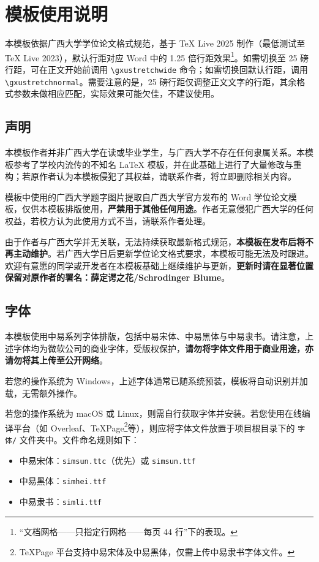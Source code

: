 \section{模板使用说明}

本模板依据广西大学学位论文格式规范，基于 \TeX{} Live 2025 制作（最低测试至 \TeX{} Live 2023），默认行距对应 Word 中的 1.25 倍行距效果\footnote{“文档网格——只指定行网格——每页 44 行”下的表现。}。如需切换至 25 磅行距，可在正文开始前调用 \verb|\gxustretchwide| 命令；如需切换回默认行距，调用 \verb|\gxustretchnormal|。需要注意的是，25 磅行距仅调整正文文字的行距，其余格式参数未做相应匹配，实际效果可能欠佳，不建议使用。

\subsection{声明}

本模板作者并非广西大学在读或毕业学生，与广西大学不存在任何隶属关系。本模板参考了学校内流传的不知名 \LaTeX{} 模板，并在此基础上进行了大量修改与重构；若原作者认为本模板侵犯了其权益，请联系作者，将立即删除相关内容。

模板中使用的广西大学题字图片提取自广西大学官方发布的 Word 学位论文模板，仅供本模板排版使用，\textbf{严禁用于其他任何用途}。作者无意侵犯广西大学的任何权益，若校方认为此使用方式不当，请联系作者处理。

由于作者与广西大学并无关联，无法持续获取最新格式规范，\textbf{本模板在发布后将不再主动维护}。若广西大学日后更新学位论文格式要求，本模板可能无法及时跟进。欢迎有意愿的同学或开发者在本模板基础上继续维护与更新，\textbf{更新时请在显著位置保留对原作者的署名：薛定谔之花/Schrodinger Blume}。

\subsection{字体}

本模板使用中易系列字体排版，包括中易宋体、中易黑体与中易隶书。请注意，上述字体均为微软公司的商业字体，受版权保护，\textbf{请勿将字体文件用于商业用途，亦请勿将其上传至公开网络}。

若您的操作系统为 Windows，上述字体通常已随系统预装，模板将自动识别并加载，无需额外操作。

若您的操作系统为 macOS 或 Linux，则需自行获取字体并安装。若您使用在线编译平台（如 Overleaf、TeXPage\footnote{TeXPage 平台支持中易宋体及中易黑体，仅需上传中易隶书字体文件。}等），则应将字体文件放置于项目根目录下的 \texttt{字体/} 文件夹中。文件命名规则如下：
\begin{itemize}
    \item 中易宋体：\texttt{simsun.ttc}（优先）或 \texttt{simsun.ttf}
    \item 中易黑体：\texttt{simhei.ttf}
    \item 中易隶书：\texttt{simli.ttf}
\end{itemize}

